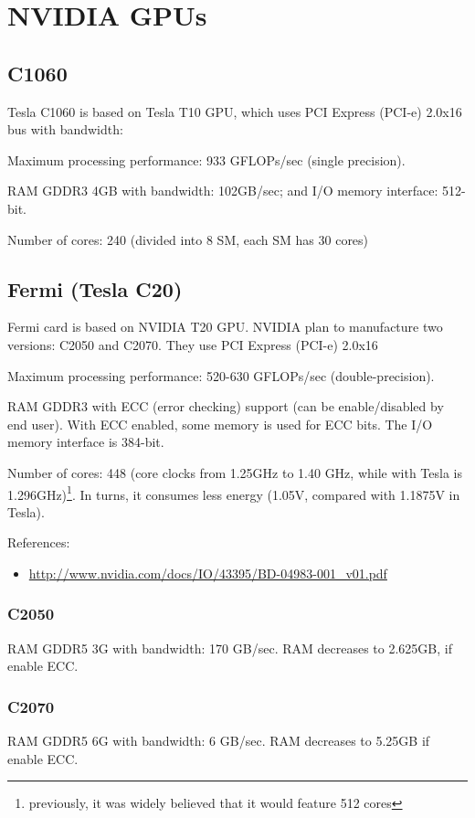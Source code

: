
\chapter{NVIDIA GPUs}
\label{chap:nvidia-gpus}


\section{C1060}
\label{sec:c1060}

Tesla C1060 is based on Tesla T10 GPU, which uses PCI Express (PCI-e) 2.0x16
bus with bandwidth: 

Maximum processing performance: 933 GFLOPs/sec (single precision).

RAM GDDR3 4GB with bandwidth: 102GB/sec; and I/O memory interface:
512-bit.

Number of cores: 240 (divided into 8 SM, each SM has 30 cores)


\section{Fermi (Tesla C20)}
\label{sec:fermi}

Fermi card is based on NVIDIA T20 GPU. NVIDIA plan to manufacture two
versions: C2050 and C2070. They use PCI Express (PCI-e) 2.0x16

Maximum processing performance: 520-630 GFLOPs/sec (double-precision).

RAM GDDR3 with ECC (error checking) support (can be enable/disabled by
end user). With ECC enabled, some memory is used for ECC bits. The I/O
memory interface is 384-bit. 

Number of cores: 448 (core clocks from 1.25GHz to 1.40 GHz, while with
Tesla is 1.296GHz)\footnote{previously, it was widely believed that it
  would feature 512 cores}. In turns, it consumes less energy (1.05V, compared
with 1.1875V in Tesla). 

References:
\begin{itemize}
\item \url{http://www.nvidia.com/docs/IO/43395/BD-04983-001_v01.pdf}
\end{itemize}
\subsection{C2050}
\label{sec:c2050}

RAM GDDR5 3G with bandwidth: 170 GB/sec. RAM decreases to 2.625GB, if
enable ECC.

\subsection{C2070}
\label{sec:c2070}

RAM GDDR5 6G with bandwidth: 6 GB/sec. RAM decreases to 5.25GB if
enable ECC.




